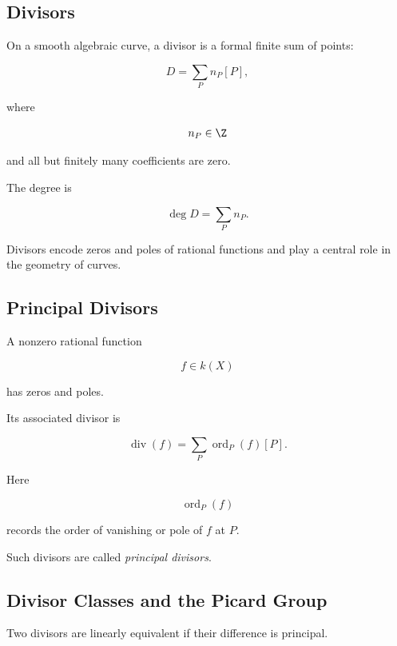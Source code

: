 \subsection{Divisors}
\label{subsec:algebraic-divisors}

On a smooth algebraic curve, a divisor is a formal finite sum of points:

\[
\boxed{
D=\sum_P n_P[P],
}
\]

where

\[
n_P\in\Z
\]

and all but finitely many coefficients are zero.

The degree is

\[
\boxed{
\deg D=\sum_P n_P.
}
\]

Divisors encode zeros and poles of rational functions and play a central
role in the geometry of curves.

\subsection{Principal Divisors}
\label{subsec:principal-divisors}

A nonzero rational function

\[
f\in k(X)
\]

has zeros and poles.

Its associated divisor is

\[
\boxed{
\operatorname{div}(f)
=
\sum_P
\operatorname{ord}_P(f)[P].
}
\]

Here

\[
\operatorname{ord}_P(f)
\]

records the order of vanishing or pole of \(f\) at \(P\).

Such divisors are called \emph{principal divisors}.

\subsection{Divisor Classes and the Picard Group}
\label{subsec:picard-group}

Two divisors are linearly equivalent if their difference is principal.

